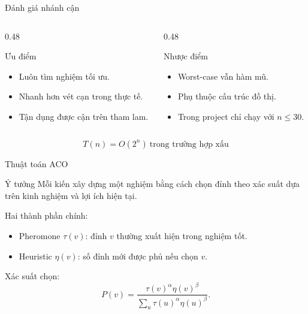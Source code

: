 \documentclass[aspectratio=169, 11pt]{beamer}
\begin{document}
\begin{frame}{Đánh giá nhánh cận}
  \begin{columns}
    \begin{column}{0.48\textwidth}
      \begin{block}{Ưu điểm}
        \begin{itemize}
          \item Luôn tìm nghiệm tối ưu.
          \item Nhanh hơn vét cạn trong thực tế.
          \item Tận dụng được cận trên tham lam.
        \end{itemize}
      \end{block}
    \end{column}
    \begin{column}{0.48\textwidth}
      \begin{block}{Nhược điểm}
        \begin{itemize}
          \item Worst-case vẫn hàm mũ.
          \item Phụ thuộc cấu trúc đồ thị.
          \item Trong project chỉ chạy với $n\leq30$.
        \end{itemize}
      \end{block}
    \end{column}
  \end{columns}

  \vspace{0.4cm}
  \[
    T(n)=O(2^n)\ \text{trong trường hợp xấu}
  \]
\end{frame}



\begin{frame}{Thuật toán ACO}
  \begin{block}{Ý tưởng}
    Mỗi kiến xây dựng một nghiệm bằng cách chọn đỉnh theo xác suất dựa trên kinh nghiệm và lợi ích hiện tại.
  \end{block}

  Hai thành phần chính:
  \begin{itemize}
    \item Pheromone $\tau(v)$: đỉnh $v$ thường xuất hiện trong nghiệm tốt.
    \item Heuristic $\eta(v)$: số đỉnh mới được phủ nếu chọn $v$.
  \end{itemize}

  Xác suất chọn:
  \[
    P(v)=\frac{\tau(v)^\alpha \eta(v)^\beta}
    {\sum_{u}\tau(u)^\alpha \eta(u)^\beta}.
  \]
\end{frame}
\end{document}
